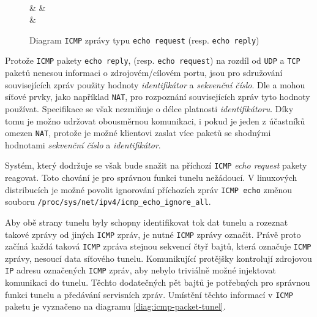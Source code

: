 \documentclass[thesis=M,czech]{FITthesis}[2012/10/20]
\begin{document}
    \begin{figure}[h]
    \centering
	\begin{bytefield}[bitwidth=1em]{32}
	    \\
	     &  & 
	    \\
	     & 
	    \\
	\end{bytefield}
	\caption{Diagram \texttt{ICMP} zprávy typu \texttt{echo request} (resp. \texttt{echo reply})}
	\label{diag:icmp-packet}
    \end{figure}
    
    Protože \texttt{ICMP} pakety \texttt{echo reply}, (resp. \texttt{echo request}) na rozdíl od \texttt{UDP} a \texttt{TCP} paketů nenesou informaci o zdrojovém/cílovém portu, jsou pro sdružování souvisejících zpráv použity hodnoty \textit{identifikátor} a \textit{sekvenční číslo}. Dle \cite[RFC 792]{rfc792} a \cite[RFC 3022]{rfc3022} mohou síťové prvky, jako například \texttt{NAT}, pro rozpoznání souvisejících zpráv tyto hodnoty používat. Specifikace se však nezmiňuje o délce platnosti \textit{identifikátoru}. Díky tomu je možno udržovat obousměrnou komunikaci, i pokud je jeden z účastníků omezen \texttt{NAT}, protože je možné klientovi  zaslat více paketů se shodnými hodnotami \textit{sekvenční číslo} a \textit{identifikátor}.
    
    Systém, který dodržuje \cite[RFC1122]{rfc1122} se však bude snažit na příchozí \texttt{ICMP} \textit{echo request} pakety reagovat. Toto chování je pro správnou funkci tunelu nežádoucí. V linuxových distribucích je možné povolit ignorování příchozích zpráv \texttt{ICMP echo} změnou souboru \texttt{/proc/sys/net/ipv4/icmp\_echo\_ignore\_all}.
    
    Aby obě strany tunelu byly schopny identifikovat tok dat tunelu a rozeznat takové zprávy od jiných \texttt{ICMP} zpráv, je nutné  \texttt{ICMP} zprávy označit. Právě proto začíná každá taková \texttt{ICMP} zpráva stejnou sekvencí čtyř bajtů, která označuje \texttt{ICMP} zprávy, nesoucí data síťového tunelu. Komunikující protějšky kontrolují zdrojovou \texttt{IP} adresu označených \texttt{ICMP} zpráv, aby nebylo triviálně možné injektovat komunikaci do tunelu. Těchto dodatečných pět bajtů je potřebných pro správnou funkci tunelu a předávání servisních zpráv. Umístění těchto informací v \texttt{ICMP} paketu je vyznačeno na diagramu \ref{diag:icmp-packet-tunel}.
    
\end{document}
